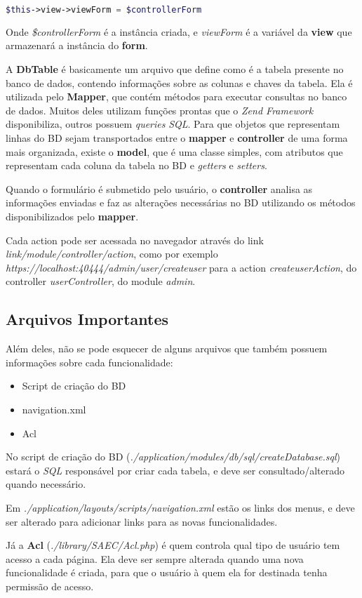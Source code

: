 \begin{lstlisting}[language=php]
    $this->view->viewForm = $controllerForm
\end{lstlisting}

Onde \textit{\$controllerForm} é a instância criada, e \textit{viewForm} é a variável da \textbf{view} que armazenará a instância do \textbf{form}.

A \textbf{DbTable} é basicamente um arquivo que define como é a tabela presente no banco de dados, contendo informações sobre as colunas e chaves da tabela. Ela é utilizada pelo \textbf{Mapper}, que contém métodos para executar consultas no banco de dados. Muitos deles utilizam funções prontas que o \textit{Zend Framework} disponibiliza, outros possuem \textit{queries} \textit{SQL}. Para que objetos que representam linhas do BD sejam transportados entre o \textbf{mapper} e \textbf{controller} de uma forma mais organizada, existe o \textbf{model}, que é uma classe simples, com atributos que representam cada coluna da tabela no BD e \textit{getters} e \textit{setters}.

Quando o formulário é submetido pelo usuário, o \textbf{controller} analisa as informações enviadas e faz as alterações necessárias no BD utilizando os métodos disponibilizados pelo \textbf{mapper}.

Cada action pode ser acessada no navegador através do link \textit{link/module/controller/action}, como por exemplo \textit{https://localhost:40444/admin/user/createuser} para a action \textit{createuserAction}, do controller \textit{userController}, do module \textit{admin}.

\subsection{Arquivos Importantes}

Além deles, não se pode esquecer de alguns arquivos que também possuem informações sobre cada funcionalidade:
    \begin{itemize}
        \item Script de criação do BD
        \item navigation.xml 
        \item Acl
    \end{itemize}

No script de criação do BD (\textit{./application/modules/db/sql/createDatabase.sql}) estará o \textit{SQL} responsável por criar cada tabela, e deve ser consultado/alterado quando necessário.

Em \textit{./application/layouts/scripts/navigation.xml} estão os links dos menus, e deve ser alterado para adicionar links para as novas funcionalidades.

Já a \textbf{Acl} (\textit{./library/SAEC/Acl.php}) é quem controla qual tipo de usuário tem acesso a cada página. Ela deve ser sempre alterada quando uma nova funcionalidade é criada, para que o usuário à quem ela for destinada tenha permissão de acesso.



